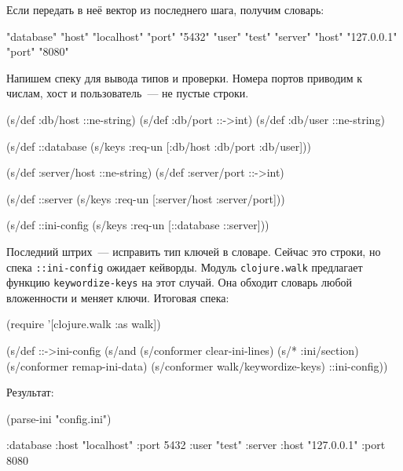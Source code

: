 \noindent
Если передать в неё вектор из последнего шага, получим словарь:

\begin{english}
  \begin{clojure}
{"database" {"host" "localhost" "port" "5432" "user" "test"}
 "server" {"host" "127.0.0.1" "port" "8080"}}
  \end{clojure}
\end{english}

Напишем спеку для вывода типов и проверки. Номера портов приводим к числам, хост
и пользователь~--- не пустые строки.

\begin{english}
  \begin{clojure}
(s/def :db/host ::ne-string)
(s/def :db/port ::->int)
(s/def :db/user ::ne-string)

(s/def ::database
  (s/keys :req-un [:db/host :db/port :db/user]))

(s/def :server/host ::ne-string)
(s/def :server/port ::->int)

(s/def ::server
  (s/keys :req-un [:server/host :server/port]))

(s/def ::ini-config
  (s/keys :req-un [::database ::server]))
  \end{clojure}
\end{english}


Последний штрих~--- исправить тип ключей в словаре. Сейчас это строки, но спека
\verb|::ini-config| ожидает кейворды. Модуль \verb|clojure.walk| предлагает
функцию \verb|keywordize-keys| на этот случай. Она обходит словарь любой
вложенности и меняет ключи. Итоговая спека:

\begin{english}
  \begin{clojure}
(require '[clojure.walk :as walk])

(s/def ::->ini-config
  (s/and
   (s/conformer clear-ini-lines)
   (s/* :ini/section)
   (s/conformer remap-ini-data)
   (s/conformer walk/keywordize-keys)
   ::ini-config))
  \end{clojure}
\end{english}

\noindent
Результат:

\begin{english}
  \begin{clojure}
(parse-ini "config.ini")

{:database {:host "localhost"
            :port 5432
            :user "test"}
 :server {:host "127.0.0.1"
          :port 8080}}
  \end{clojure}
\end{english}

